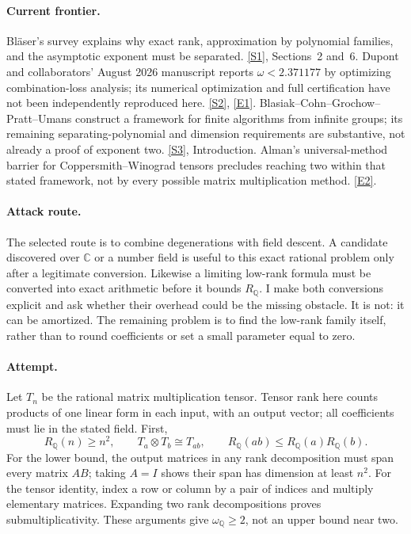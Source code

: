 \documentclass[11pt,a4paper]{article}
\newcommand{\Q}{\mathbb{Q}}
\newcommand{\C}{\mathbb{C}}
\newcommand{\sref}[2]{\hyperlink{source:#1:#2}{[S#2]}}
\newcommand{\eref}[2]{\hyperlink{extra:#1:#2}{[E#2]}}
\numberwithin{equation}{section}
\begin{document}
\paragraph{Current frontier.}
Bl\"aser's survey explains why exact rank, approximation by polynomial
families, and the asymptotic exponent must be separated. \sref{statement}{1},
Sections~2 and~6. Dupont and collaborators' August 2026 manuscript reports
$\omega<2.371177$ by optimizing combination-loss analysis; its numerical
optimization and full certification have not been independently reproduced
here. \sref{statement}{2}, \eref{statement}{1}. Blasiak--Cohn--Grochow--Pratt--Umans
construct a framework for finite algorithms from infinite groups; its
remaining separating-polynomial and dimension requirements are substantive,
not already a proof of exponent two. \sref{statement}{3}, Introduction.
Alman's universal-method barrier for Coppersmith--Winograd tensors
precludes reaching two within that stated framework, not by every possible
matrix multiplication method. \eref{statement}{2}.

\paragraph{Attack route.}
The selected route is to combine degenerations with field descent. A
candidate discovered over $\C$ or a number field is useful to this exact
rational problem only after a legitimate conversion. Likewise a limiting
low-rank formula must be converted into exact arithmetic before it bounds
$R_{\Q}$. I make both conversions explicit and ask whether their overhead
could be the missing obstacle. It is not: it can be amortized. The remaining
problem is to find the low-rank family itself, rather than to round
coefficients or set a small parameter equal to zero.

\paragraph{Attempt.}
Let $T_n$ be the rational matrix multiplication tensor. Tensor rank here
counts products of one linear form in each input, with an output vector;
all coefficients must lie in the stated field. First,
\begin{equation}\label{r26:basic}
 R_{\Q}(n)\ge n^2,\qquad T_a\otimes T_b\cong T_{ab},
 \qquad R_{\Q}(ab)\le R_{\Q}(a)R_{\Q}(b).
\end{equation}
For the lower bound, the output matrices in any rank decomposition must
span every matrix $AB$; taking $A=I$ shows their span has dimension at
least $n^2$. For the tensor identity, index a row or column by a pair
of indices and multiply elementary matrices. Expanding two rank
decompositions proves submultiplicativity. These arguments give
$\omega_{\Q}\ge2$, not an upper bound near two.
\end{document}
